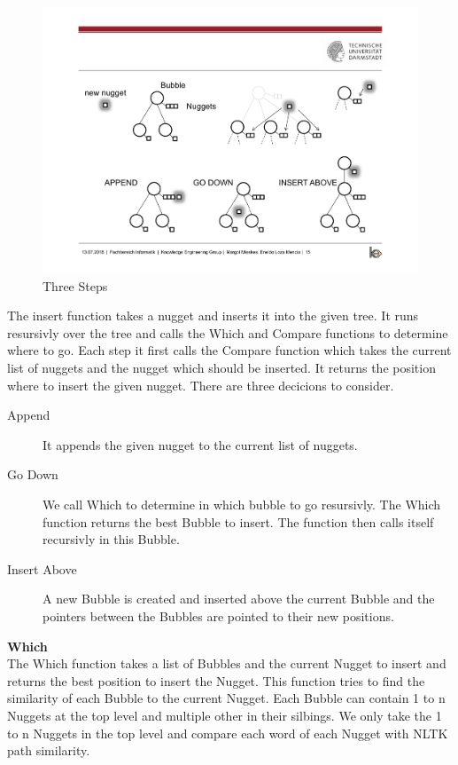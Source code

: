 \begin{figure}[H]
	\centering
	\includegraphics[trim=3cm 3cm 3cm 11cm, clip=true, width= \textwidth]{img/step2_func.pdf}
	\caption{Three Steps}
	\label{fig:jsd}
\end{figure}

The insert function takes a nugget and inserts it into the given tree. It runs resursivly over the tree and calls the Which and Compare functions to determine where to go. Each step it first calls the Compare function which takes the current list of nuggets and the nugget which should be inserted. It returns the position where to insert the given nugget. There are three decicions to consider.

\begin{description}
\item [Append] It appends the given nugget to the current list of nuggets.
\item [Go Down] We call Which to determine in which bubble to go resursivly. The Which function returns the best Bubble to insert. The function then calls itself recursivly in this Bubble.
\item [Insert Above] A new Bubble is created and inserted above the current Bubble and the pointers between the Bubbles are pointed to their new positions.
\end{description}

\textbf{Which}\\

The Which function takes a list of Bubbles and the current Nugget to insert and returns the best position to insert the Nugget. This function tries to find the similarity of each Bubble to the current Nugget. Each Bubble can contain 1 to n Nuggets at the top level and multiple other in their silbings. We only take the 1 to n Nuggets in the top level and compare each word of each Nugget with NLTK path similarity.

